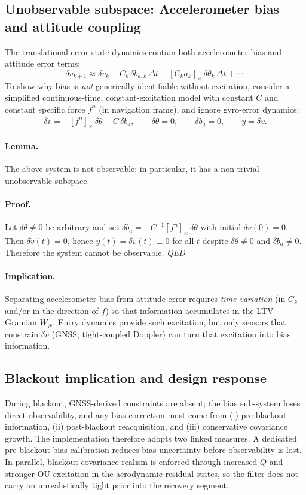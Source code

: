 \documentclass[10pt]{article}
\newcommand{\crossmat}[1]{\left[#1\right]_{\times}}
\begin{document}
\subsection{Unobservable subspace: Accelerometer bias and attitude coupling}
The translational error-state dynamics contain both accelerometer bias and attitude error terms:
\begin{equation}
  \delta v_{k+1} \approx \delta v_k - C_k\,\delta b_{a,k}\,\Delta t - \crossmat{C_k a_k}\,\delta\theta_k\,\Delta t + \cdots.
\end{equation}
To show why bias is \emph{not} generically identifiable without excitation, consider a simplified continuous-time, constant-excitation model
with constant $C$ and constant specific force $f^n$ (in navigation frame), and ignore gyro-error dynamics:
\begin{equation}
  \delta \dot v = -\crossmat{f^n}\,\delta\theta - C\,\delta b_a,\qquad
  \delta \dot\theta = 0,\qquad
  \delta \dot b_a = 0,\qquad
  y = \delta v.
\end{equation}
\paragraph{Lemma.}
The above system is not observable; in particular, it has a non-trivial unobservable subspace.
\paragraph{Proof.}
Let $\delta\theta\neq 0$ be arbitrary and set $\delta b_a = -C^{-1}\crossmat{f^n}\,\delta\theta$ with initial $\delta v(0)=0$.
Then $\delta \dot v(t)=0$, hence $y(t)=\delta v(t)\equiv 0$ for all $t$ despite $\delta\theta\neq 0$ and $\delta b_a\neq 0$.
Therefore the system cannot be observable. \hfill\textit{QED}

\paragraph{Implication.}
Separating accelerometer bias from attitude error requires \emph{time variation} (in $C_k$ and/or in the direction of $f$) so that information
accumulates in the LTV Gramian $W_N$.
Entry dynamics provide such excitation, but only sensors that constrain $\delta v$ (GNSS, tight-coupled Doppler) can turn that excitation into bias information.

\subsection{Blackout implication and design response}
During blackout, GNSS-derived constraints are absent; the bias sub-system loses direct observability, and
any bias correction must come from (i) pre-blackout information, (ii) post-blackout reacquisition, and (iii) conservative covariance growth.
The implementation therefore adopts two linked measures. A dedicated pre-blackout bias calibration reduces bias uncertainty before observability is lost. In parallel, blackout covariance realism is enforced through increased $Q$ and stronger OU excitation in the aerodynamic residual states, so the filter does not carry an unrealistically tight prior into the recovery segment.
\end{document}
